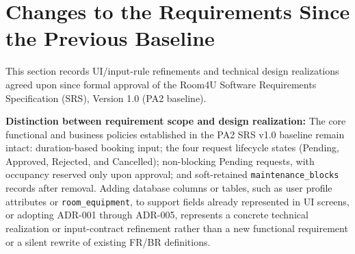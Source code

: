 \section{Changes to the Requirements Since the Previous Baseline}
This section records UI/input-rule refinements and technical design realizations agreed upon since formal approval of the Room4U Software Requirements Specification (SRS), Version 1.0 (PA2 baseline).

\textbf{Distinction between requirement scope and design realization:} The core functional and business policies established in the PA2 SRS v1.0 baseline remain intact: duration-based booking input; the four request lifecycle states (Pending, Approved, Rejected, and Cancelled); non-blocking Pending requests, with occupancy reserved only upon approval; and soft-retained \texttt{maintenance\_blocks} records after removal. Adding database columns or tables, such as user profile attributes or \texttt{room\_equipment}, to support fields already represented in UI screens, or adopting ADR-001 through ADR-005, represents a concrete technical realization or input-contract refinement rather than a new functional requirement or a silent rewrite of existing FR/BR definitions.


